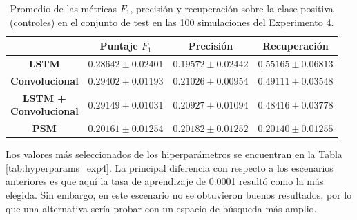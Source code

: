 \documentclass[../../main.tex]{subfiles}
\begin{document}
\begin{table}[H]
    \centering
    \renewcommand{\arraystretch}{1.2}
    \begin{tabular}{|c|c|c|c|}
        \hline
         & \textbf{Puntaje} \(F_1\) & \textbf{Precisión} & \textbf{Recuperación} \\ \hline\hline
        \textbf{LSTM}
            & $0.28642 \pm 0.02401$ & $0.19572 \pm 0.02442$ & $\mathbf{0.55165 \pm 0.06813}$ \\ \hline
        \textbf{Convolucional}
            & $\mathbf{0.29402 \pm 0.01193}$ & $\mathbf{0.21026 \pm 0.00954}$ & $0.49111 \pm 0.03548$ \\ \hline
        \makecell{\textbf{LSTM +} \\ \textbf{Convolucional}}
            & $0.29149 \pm 0.01031$ & $0.20927 \pm 0.01094$ & $0.48416 \pm 0.03778$ \\ \hline
        \textbf{PSM}
            & $0.20161 \pm 0.01254$ & $0.20182 \pm 0.01252$ & $0.20140 \pm 0.01255$ \\
        \hline
    \end{tabular}
    \caption{Promedio de las métricas \(F_1\), precisión y recuperación sobre la
    clase positiva (controles) en el conjunto de test en las 100 simulaciones del
    Experimento 4.}
    \label{tab:results_exp4}
\end{table}

Los valores más seleccionados de los hiperparámetros se encuentran en la Tabla
\ref{tab:hyperparams_exp4}. La principal diferencia con respecto a los escenarios
anteriores es que aquí la tasa de aprendizaje de 0.0001 resultó como la más elegida. Sin
embargo, en este escenario no se obtuvieron buenos resultados, por lo que una alternativa
sería probar con un espacio de búsqueda más amplio.
\end{document}
